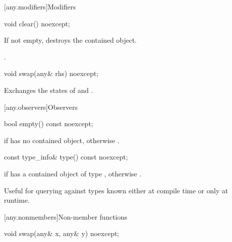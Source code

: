 [any.modifiers]{Modifiers}

\begin{itemdecl}
void clear() noexcept;
\end{itemdecl}

\begin{itemdescr}
\pnum
\effects
If not empty, destroys the contained object.

\pnum
\postcondition
{}.
\end{itemdescr}

\begin{itemdecl}
void swap(any& rhs) noexcept;
\end{itemdecl}

\begin{itemdescr}

\pnum
\effects
Exchanges the states of  and .
\end{itemdescr}

[any.observers]{Observers}

\begin{itemdecl}
bool empty() const noexcept;
\end{itemdecl}

\begin{itemdescr}
\pnum
\returns
{} if  has no contained object, otherwise .
\end{itemdescr}

\begin{itemdecl}
const type_info& type() const noexcept;
\end{itemdecl}

\begin{itemdescr}
\pnum
\returns
{} if  has a contained object of type ,
otherwise .

\pnum
\enternote
Useful for querying against types known either at compile time or only at runtime.
\exitnote
\end{itemdescr}

[any.nonmembers]{Non-member functions}

\begin{itemdecl}
void swap(any& x, any& y) noexcept;
\end{itemdecl}

